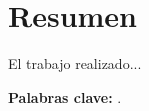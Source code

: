 \chapter*{Resumen}
\label{cha:resumen}


El trabajo realizado...

\textbf{Palabras clave:} \mybookpalabrasclave.
